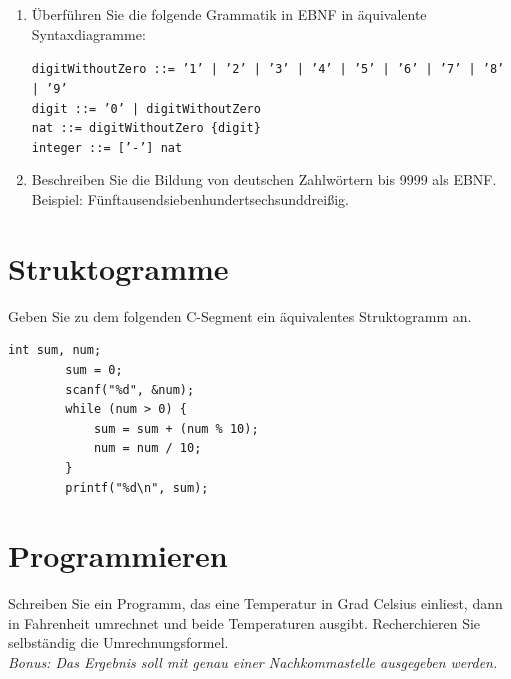\documentclass[]{article}
\begin{document}
\begin{enumerate}
		\item Überführen Sie die folgende Grammatik in EBNF in äquivalente Syntaxdiagramme:
		
		\texttt{digitWithoutZero ::= '1' | '2' | '3' | '4' | '5' | '6' | '7' | '8' | '9'\\[1ex]
		digit ::= '0' | digitWithoutZero	\\[1ex]
		nat ::= digitWithoutZero \{digit\}\\[1ex]
		integer ::= ['-'] nat}
		
		\vspace{30ex}
	
		\item Beschreiben Sie die Bildung von deutschen Zahlwörtern bis 9999 als EBNF.\\ Beispiel: Fünftausendsiebenhundertsechsunddreißig.
		
	\end{enumerate}
	
	\newpage
	
	\section{Struktogramme}

	Geben Sie zu dem folgenden C-Segment ein äquivalentes Struktogramm an.
	
	\begin{lstlisting}[gobble=4]
		int sum, num;
		sum = 0;
		scanf("%d", &num);
		while (num > 0) {
			sum = sum + (num % 10);
			num = num / 10;
		}
		printf("%d\n", sum);
	\end{lstlisting}
	
	\vspace{30ex}
	
	\section{Programmieren}
	
	Schreiben Sie ein Programm, das eine Temperatur in Grad Celsius einliest, dann in Fahrenheit umrechnet und beide Temperaturen ausgibt.
	Recherchieren Sie selbständig die Umrechnungsformel.\\
	\textit{Bonus: Das Ergebnis soll mit genau einer Nachkommastelle ausgegeben werden.}
	
\end{document}
